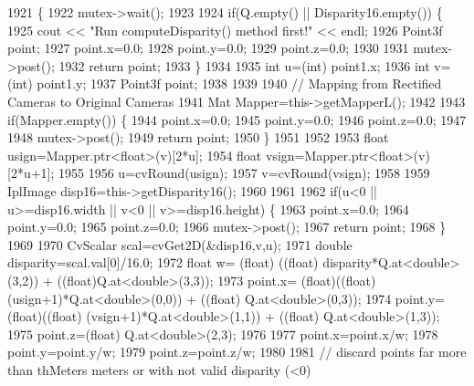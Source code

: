 \begin{DoxyCode}
1921                                                                           \{
1922     mutex->wait();
1923 
1924     \textcolor{keywordflow}{if}(Q.empty() || Disparity16.empty()) \{
1925         cout << \textcolor{stringliteral}{"Run computeDisparity() method first!"} << endl;
1926         Point3f point;
1927         point.x=0.0;
1928         point.y=0.0;
1929         point.z=0.0;
1930 
1931         mutex->post();
1932         \textcolor{keywordflow}{return} point;
1933     \}
1934 
1935     \textcolor{keywordtype}{int} u=(int) point1.x;
1936     \textcolor{keywordtype}{int} v=(\textcolor{keywordtype}{int}) point1.y;
1937     Point3f point;
1938 
1939 
1940     \textcolor{comment}{// Mapping from Rectified Cameras to Original Cameras}
1941     Mat Mapper=this->getMapperL();
1942 
1943     \textcolor{keywordflow}{if}(Mapper.empty()) \{
1944         point.x=0.0;
1945         point.y=0.0;
1946         point.z=0.0;
1947 
1948         mutex->post();
1949         \textcolor{keywordflow}{return} point;
1950     \}
1951 
1952 
1953     \textcolor{keywordtype}{float} usign=Mapper.ptr<\textcolor{keywordtype}{float}>(v)[2*u];
1954     \textcolor{keywordtype}{float} vsign=Mapper.ptr<\textcolor{keywordtype}{float}>(v)[2*u+1];
1955 
1956     u=cvRound(usign);
1957     v=cvRound(vsign);
1958 
1959     IplImage disp16=this->getDisparity16();
1960 
1961 
1962     \textcolor{keywordflow}{if}(u<0 || u>=disp16.width || v<0 || v>=disp16.height) \{
1963         point.x=0.0;
1964         point.y=0.0;
1965         point.z=0.0;
1966         mutex->post();
1967         \textcolor{keywordflow}{return} point;
1968     \}
1969 
1970     CvScalar scal=cvGet2D(&disp16,v,u);
1971     \textcolor{keywordtype}{double} disparity=scal.val[0]/16.0;
1972     \textcolor{keywordtype}{float} w= (float) ((\textcolor{keywordtype}{float}) disparity*Q.at<\textcolor{keywordtype}{double}>(3,2)) + ((float)Q.at<\textcolor{keywordtype}{double}>(3,3));
1973     point.x= (float)((\textcolor{keywordtype}{float}) (usign+1)*Q.at<\textcolor{keywordtype}{double}>(0,0)) + ((\textcolor{keywordtype}{float}) Q.at<\textcolor{keywordtype}{double}>(0,3));
1974     point.y=(float)((\textcolor{keywordtype}{float}) (vsign+1)*Q.at<\textcolor{keywordtype}{double}>(1,1)) + ((\textcolor{keywordtype}{float}) Q.at<\textcolor{keywordtype}{double}>(1,3));
1975     point.z=(float) Q.at<\textcolor{keywordtype}{double}>(2,3);
1976 
1977     point.x=point.x/w;
1978     point.y=point.y/w;
1979     point.z=point.z/w;
1980 
1981     \textcolor{comment}{// discard points far more than thMeters meters or with not valid disparity (<0)}

\end{DoxyCode}
